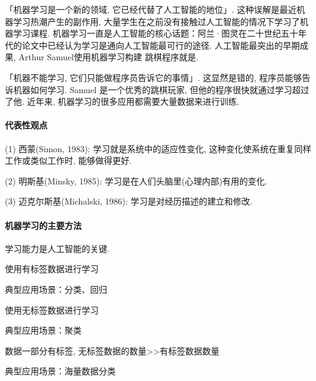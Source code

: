 「机器学习是一个新的领域, 它已经代替了人工智能的地位」. 这种误解是最近机器学习热潮产生的副作用, 大量学生在之前没有接触过人工智能的情况下学习了机器学习课程. 机器学习一直是人工智能的核心话题：阿兰·图灵在二十世纪五十年代的论文中已经认为学习是通向人工智能最可行的途径. 人工智能最突出的早期成果, Arthur Samuel使用机器学习构建 跳棋程序就是.

「机器不能学习, 它们只能做程序员告诉它的事情」. 这显然是错的, 程序员能够告诉机器如何学习. Samuel 是一个优秀的跳棋玩家, 但他的程序很快就通过学习超过了他. 近年来, 机器学习的很多应用都需要大量数据来进行训练.
\paragraph{代表性观点}

    (1) 西蒙(Simon, 1983): 学习就是系统中的适应性变化, 这种变化使系统在重复同样工作或类似工作时, 能够做得更好.

    (2) 明斯基(Minsky, 1985): 学习是在人们头脑里(心理内部)有用的变化.

    (3) 迈克尔斯基(Michalski, 1986): 学习是对经历描述的建立和修改.

\paragraph{机器学习的主要方法}
学习能力是人工智能的关键.
\begin{tcolorbox}[colback=white!50,colframe=orange!50,title=监督学习( Supervised learning)]
\begin{center}
使用有标签数据进行学习

典型应用场景：分类、回归
\hfill
\end{center}
\end{tcolorbox}

\begin{tcolorbox}[colback=white!50,colframe=orange!50,title=非监督学习( Unsupervised learning)]
使用无标签数据进行学习

典型应用场景：聚类
\end{tcolorbox}

\begin{tcolorbox}[colback=white!50,colframe=orange!50,title=半监督学习( Semi-supervised learning)]
数据一部分有标签, 无标签数据的数量>>有标签数据数量

典型应用场景：海量数据分类
\end{tcolorbox}

